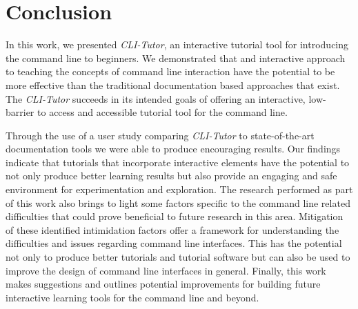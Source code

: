 \chapter{Conclusion}
\label{chap:conclusion}

In this work, we presented \textit{CLI-Tutor}, an interactive tutorial tool for
introducing the command line to beginners. We demonstrated that and interactive
approach to teaching the concepts of command line interaction have the
potential to be more effective than the traditional documentation based
approaches that exist. The \textit{CLI-Tutor} succeeds in its intended goals of
offering an interactive, low-barrier to access and accessible tutorial tool for
the command line.

Through the use of a user study comparing \textit{CLI-Tutor} to
state-of-the-art documentation tools we were able to produce encouraging
results. Our findings indicate that tutorials that incorporate interactive
elements have the potential to not only produce better learning results but
also provide an engaging and safe environment for experimentation and
exploration. The research performed as part of this work also brings to light
some factors specific to the command line related difficulties that could prove
beneficial to future research in this area. Mitigation of these identified
intimidation factors offer a framework for understanding the difficulties and
issues regarding command line interfaces. This has the potential not only to
produce better tutorials and tutorial software but can also be used to improve
the design of command line interfaces in general. Finally, this work makes
suggestions and outlines potential improvements for building future interactive
learning tools for the command line and beyond.
